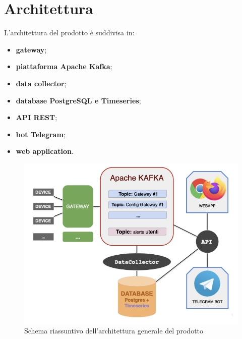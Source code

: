 \section{Architettura}

L'architettura del prodotto è suddivisa in:
	\begin{itemize}
	  	\item \textbf{gateway};
	  	\item \textbf{piattaforma Apache Kafka};
	  	\item \textbf{data collector};
	  	\item \textbf{database PostgreSQL e Timeseries};
	  	\item \textbf{API REST};
	  	\item \textbf{bot Telegram};
	  	\item \textbf{web application}.    
	\end{itemize} 

	\begin{figure}[H]
		\centering
		\includegraphics[scale=0.600]{res/images/architetturaGenerale.jpeg}
		\caption{Schema riassuntivo dell'architettura generale del prodotto}
	\end{figure}
	
